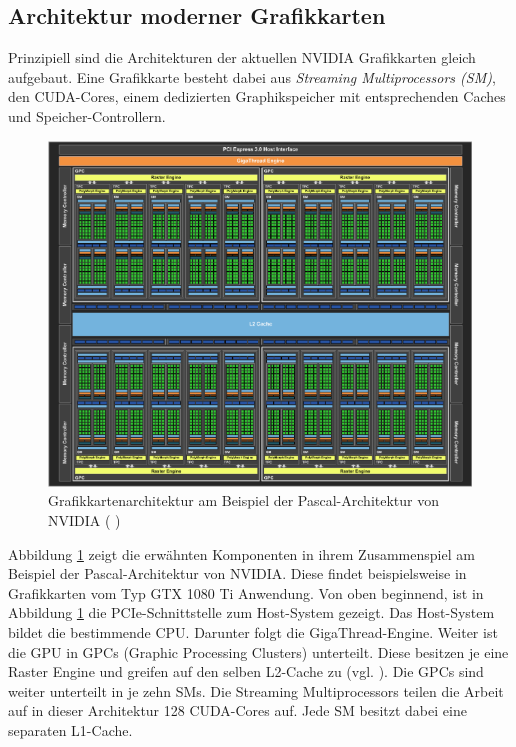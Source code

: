\documentclass[../main.tex]{subfiles}
\begin{document}
\subsection{Architektur moderner Grafikkarten} \label{sec:cuda_unterschiede}
Prinzipiell sind die Architekturen der aktuellen NVIDIA Grafikkarten gleich aufgebaut. Eine Grafikkarte besteht dabei aus \emph{Streaming Multiprocessors (SM)}, den CUDA-Cores, einem dedizierten Graphikspeicher mit entsprechenden Caches und Speicher-Controllern. \par 
\begin{figure}[!htbp]
	\centering
	\includegraphics[width=0.8\linewidth]{../images/Riedle/architektur_pascal_komplett.png}
	\caption{Grafikkartenarchitektur am Beispiel der Pascal-Architektur von NVIDIA ( \cite{Pascal_white})} \label{pic:cuda_pascal_compl}
\end{figure}
Abbildung \ref{pic:cuda_pascal_compl} zeigt die erwähnten Komponenten in ihrem Zusammenspiel am Beispiel der Pascal-Architektur von NVIDIA. Diese findet beispielsweise in Grafikkarten vom Typ GTX 1080 Ti Anwendung. Von oben beginnend, ist in Abbildung \ref{pic:cuda_pascal_compl} die PCIe-Schnittstelle zum Host-System gezeigt. Das Host-System bildet die bestimmende CPU. Darunter folgt die GigaThread-Engine. Weiter ist die GPU in GPCs (Graphic Processing Clusters) unterteilt. Diese besitzen je eine Raster Engine und greifen auf den selben L2-Cache zu (vgl. \cite{Pascal_white}). Die GPCs sind weiter unterteilt in je zehn SMs.  Die Streaming Multiprocessors teilen die Arbeit auf in dieser Architektur 128 CUDA-Cores auf. Jede SM besitzt dabei eine separaten L1-Cache. \par 
\end{document}
